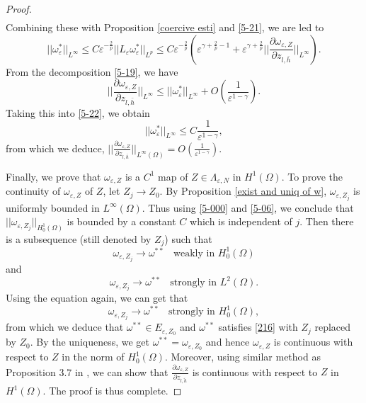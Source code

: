 \documentclass[12pt,reqno]{amsart}
\numberwithin{equation}{section}
\theoremstyle{definition}
\theoremstyle{remark}
\begin{document}
\begin{proof}
\begin{equation*}
\begin{split}
\end{split}
\end{equation*}
Combining these with Proposition \ref{coercive esti} and \eqref{5-21}, we are led to
\begin{equation}\label{5-22}
||\omega_{\varepsilon}^*||_{L^\infty }\leq C\varepsilon^{-\frac{2}{p}}||L_\varepsilon\omega_{\varepsilon}^*||_{L^p }\leq C\varepsilon^{-\frac{2}{p}} \left(\varepsilon^{\gamma+\frac{2}{p}-1}+ \varepsilon^{\gamma+\frac{2}{p}}\bigg|\bigg|\frac{\partial \omega_{\varepsilon,Z} }{\partial z_{l,\bar{h}}}\bigg|\bigg|_{L^\infty} \right).
\end{equation}
From the decomposition \eqref{5-19}, we have
\begin{equation*}
\bigg|\bigg|\frac{\partial \omega_{\varepsilon,Z} }{\partial z_{l,\bar{h}}}\bigg|\bigg|_{L^\infty}\leq ||\omega_{\varepsilon}^*||_{L^\infty }+O\left( \frac{1}{\varepsilon^{1-\gamma}}\right) .
\end{equation*}
Taking this into \eqref{5-22}, we obtain
\begin{equation*}
||\omega_{\varepsilon}^*||_{L^\infty }\leq C  \frac{1}{\varepsilon^{1-\gamma}},
\end{equation*}
from which we deduce, $ \big|\big|\frac{\partial \omega_{\varepsilon,Z} }{\partial z_{l,\bar{h}}}\big|\big|_{L^\infty(\Omega)}=O\left( \frac{1}{\varepsilon^{1-\gamma}} \right)  $.

Finally, we prove that $ \omega_{\varepsilon,Z} $ is a $ C^1 $ map of $ Z\in \Lambda_{\varepsilon, N} $ in $ H^1(\Omega) $. To prove the continuity of $ \omega_{\varepsilon,Z} $ of $ Z $, let $ Z_j\to Z_0 $. By Proposition \ref{exist and uniq of w}, $ \omega_{\varepsilon,Z_j}  $ is uniformly bounded in $ L^\infty(\Omega) $. Thus  using \eqref{5-000} and \eqref{5-06}, we conclude that $ ||\omega_{\varepsilon,Z_j}||_{H^1_0(\Omega)} $ is bounded by a constant $ C $  which is independent of $ j $. Then there is a subsequence (still denoted by $ Z_j $) such that
\begin{equation*}
\omega_{\varepsilon,Z_j}\rightarrow \omega^{**}\ \ \ \  \text{weakly in } H^1_0(\Omega)
\end{equation*}
and
\begin{equation*}
\omega_{\varepsilon,Z_j}\rightarrow \omega^{**}\ \ \ \  \text{strongly in } L^2(\Omega).
\end{equation*}
Using the equation again, we can get that
\begin{equation*}
\omega_{\varepsilon,Z_j}\rightarrow \omega^{**}\ \ \ \  \text{strongly in } H^1_0(\Omega),
\end{equation*}
from which  we deduce that $ \omega^{**}\in E_{\varepsilon,Z_0} $ and $ \omega^{**} $ satisfies \eqref{216} with $ Z_j $ replaced by $ Z_0 $.  By the uniqueness, we get $ \omega^{**}=\omega_{\varepsilon,Z_0} $ and hence  $ \omega_{\varepsilon,Z} $ is continuous with respect  to  $Z$ in the norm of $ H^1_0(\Omega) $. Moreover, using similar method as  Proposition 3.7 in  \cite{CPY}, we can show that  $ \frac{\partial \omega_{\varepsilon,Z}}{\partial z_{l,\tilde{h}}} $ is continuous with respect  to $ Z $ in $ H^1(\Omega) $. The proof is thus complete.
\end{proof}
\end{document}
